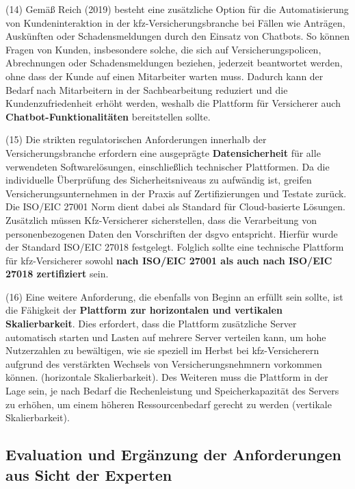 (14) Gemäß Reich (2019) besteht eine zusätzliche Option für die Automatisierung von Kundeninteraktion in der \ac{kfz}-Versicherungsbranche bei Fällen wie Anträgen, Auskünften oder Schadensmeldungen durch den Einsatz von Chatbots. So können Fragen von Kunden, insbesondere solche, die sich auf Versicherungspolicen, Abrechnungen oder Schadensmeldungen beziehen, jederzeit beantwortet werden, ohne dass der Kunde auf einen Mitarbeiter warten muss. Dadurch kann der Bedarf nach Mitarbeitern in der Sachbearbeitung reduziert und die Kundenzufriedenheit erhöht werden, weshalb die Plattform für Versicherer auch \textbf{Chatbot-Funktionalitäten} bereitstellen sollte. \autocite[Vgl.][S. 300-302]{REICH2019}

(15) Die strikten regulatorischen Anforderungen innerhalb der Versicherungsbranche erfordern eine ausgeprägte \textbf{Datensicherheit} für alle verwendeten Softwarelösungen, einschließlich technischer Plattformen. Da die individuelle Überprüfung des Sicherheitsniveaus zu aufwändig ist, greifen Versicherungsunternehmen in der Praxis auf Zertifizierungen und Testate zurück. \autocite[Vgl.][S. 777]{ZDANOWIECKI2016} Die ISO/EIC 27001 Norm dient dabei als Standard für Cloud-basierte Lösungen. Zusätzlich müssen Kfz-Versicherer sicherstellen, dass die Verarbeitung von personenbezogenen Daten den Vorschriften der \ac{dsgvo} entspricht. Hierfür wurde der Standard ISO/EIC 27018 festgelegt. Folglich sollte eine technische Plattform für \ac{kfz}-Versicherer sowohl \textbf{nach ISO/EIC 27001 als auch nach ISO/EIC 27018 zertifiziert} sein. 

(16) Eine weitere Anforderung, die ebenfalls von Beginn an erfüllt sein sollte, ist die Fähigkeit der \textbf{Plattform zur horizontalen und vertikalen Skalierbarkeit}. Dies erfordert, dass die Plattform zusätzliche Server automatisch starten und Lasten auf mehrere Server verteilen kann, um hohe Nutzerzahlen zu bewältigen, wie sie speziell im Herbst bei \ac{kfz}-Versicherern aufgrund des verstärkten Wechsels von Versicherungsnehmnern vorkommen können. (horizontale Skalierbarkeit). Des Weiteren muss die Plattform in der Lage sein, je nach Bedarf die Rechenleistung und Speicherkapazität des Servers zu erhöhen, um einem höheren Ressourcenbedarf gerecht zu werden (vertikale Skalierbarkeit). \autocite[Vgl.][S. 23]{JAHNERT2020}

\subsection{Evaluation und Ergänzung der Anforderungen aus Sicht der Experten}

